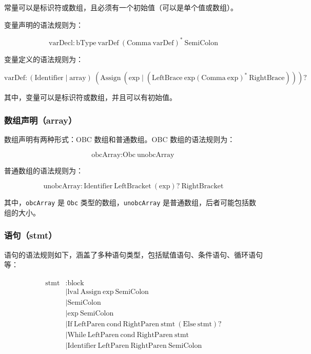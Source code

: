 \documentclass[../main.tex]{subfiles}
\begin{document}
常量可以是标识符或数组，且必须有一个初始值（可以是单个值或数组）。

变量声明的语法规则为：

\[
	\text{varDecl} \colon \text{bType} \ \text{varDef} \ (\text{Comma} \ \text{varDef})^* \ \text{SemiColon}
\]

变量定义的语法规则为：

\[
	\text{varDef} \colon (\text{Identifier} \mid \text{array}) \ (\text{Assign} \ (\text{exp} \mid (\text{LeftBrace} \ \text{exp} (\text{Comma} \ \text{exp})^* \ \text{RightBrace})) )?
\]

其中，变量可以是标识符或数组，并且可以有初始值。

\subsubsection{数组声明（array）}

数组声明有两种形式：OBC 数组和普通数组。OBC 数组的语法规则为：

\[
	\text{obcArray} \colon \text{Obc} \ \text{unobcArray}
\]

普通数组的语法规则为：

\[
	\text{unobcArray} \colon \text{Identifier} \ \text{LeftBracket} \ (\text{exp})? \ \text{RightBracket}
\]

其中，\texttt{obcArray} 是 \texttt{Obc} 类型的数组，\texttt{unobcArray} 是普通数组，后者可能包括数组的大小。

\subsubsection{语句（stmt）}

语句的语法规则如下，涵盖了多种语句类型，包括赋值语句、条件语句、循环语句等：

\begin{gather*}
	\begin{aligned}
		\text{stmt} & \colon  \text{block}                                                                                             \\
		            & \mid \text{lval} \ \text{Assign} \ \text{exp} \ \text{SemiColon}                                                 \\
		            & \mid \text{SemiColon}                                                                                            \\
		            & \mid \text{exp} \ \text{SemiColon}                                                                               \\
		            & \mid \text{If} \ \text{LeftParen} \ \text{cond} \ \text{RightParen} \ \text{stmt} \ (\text{Else} \ \text{stmt})? \\
		            & \mid \text{While} \ \text{LeftParen} \ \text{cond} \ \text{RightParen} \ \text{stmt}                             \\
		            & \mid \text{Identifier} \ \text{LeftParen} \ \text{RightParen} \ \text{SemiColon}
	\end{aligned}
\end{gather*}
\end{document}
